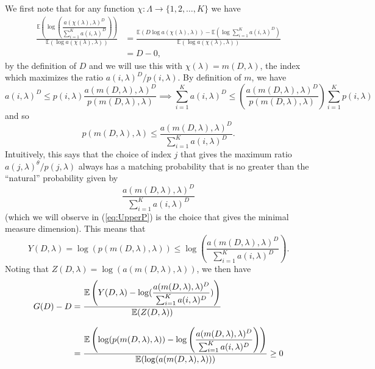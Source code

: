 \documentclass{amsart}
\theoremstyle{plain}
\numberwithin{equation}{section}
\newcommand{\ee}{{\mathbb E}}
\begin{document}
We first note that for any function $\chi:\Lambda \rightarrow \{1,2,\ldots ,K\}$ we have 
\begin{align*}
         \frac{\ee(\log \left( \dfrac{a(\chi(\lambda),\lambda)^{D}}{\sum_{i=1}^{K}a(i,\lambda)^{D}}\right))}
               {\ee(\log a(\chi(\lambda),\lambda))}
     &= \frac{\ee(D\log a(\chi(\lambda),\lambda))-\ee(\log \sum_{i=1}^{K}a(i,\lambda)^{D})}{\ee(\log a(\chi(\lambda),\lambda))} \\[6pt]
     & =D-0,
\end{align*}
by the definition of $D$ and we will use this with $\chi(\lambda) = m(D,\lambda)$, 
the index which maximizes the ratio $a(i,\lambda)^{D}/p(i,\lambda)$. 
By definition of $m$, we have 
\begin{equation*}
    a(i,\lambda)^{D}\leq p(i,\lambda)\frac{a(m(D,\lambda),\lambda)^{D}}
                                                               {p(m(D,\lambda),\lambda)}
     \implies \sum_{i=1}^{K}a(i,\lambda)^{D}  \leq 
                      \left( \frac{a(m(D,\lambda),\lambda)^{D}}{p(m(D,\lambda),\lambda)}\right) 
                     \sum_{i=1}^{K}p(i,\lambda)
\end{equation*}
and so 
\begin{equation}
     p(m(D,\lambda),\lambda)\leq 
        \frac{a(m(D,\lambda),\lambda)^{D}}{\sum_{i=1}^Ka(i,\lambda)^{D}}.  
   \label{eq:prob_inequality}
\end{equation}
Intuitively, this says that the choice of index $j$ that gives the maximum ratio $a(j,\lambda)^\theta/p(j,\lambda)$  always has a matching probability 
that is no greater than the ``natural'' probability given by 
\begin{equation*}
   \frac{a(m(D,\lambda),\lambda)^{D}}{\sum_{i=1}^Ka(i,\lambda)^{D}}
\end{equation*}
(which we will observe in (\ref{eq:UpperP}) is the choice that gives the minimal measure dimension). 
This means that 
\begin{equation*}
        Y(D,\lambda)=\log (p(m(D,\lambda),\lambda))\leq 
    \log \left( \frac{a(m(D,\lambda),\lambda)^{D}}{\sum_{i=1}^Ka(i,\lambda)^{D}}\right).
\end{equation*}
Noting that $Z(D,\lambda)=\log (a(m(D,\lambda),\lambda))$, we then
have 
\begin{align}
      G(D)-D &=\frac{\ee\left( Y(D,\lambda)-\log (\dfrac{a(m(D,\lambda),\lambda)^{D}}{\sum_{i=1}^K a(i,\lambda)^{D}})\right)}
                             {\ee(Z(D,\lambda))}  \notag \\[8pt]
                 &= \frac{\ee\left( \log (p(m(D,\lambda),\lambda))-\log\left( \dfrac{a(m(D,\lambda),\lambda)^{D}}
                                  {\sum_{i=1}^Ka(i,\lambda)^{D}}\right) \right)}
                             {\ee(\log (a(m(D,\lambda),\lambda)))} \geq 0  
             \label{eq:general_gap}
\end{align}
\end{document}
